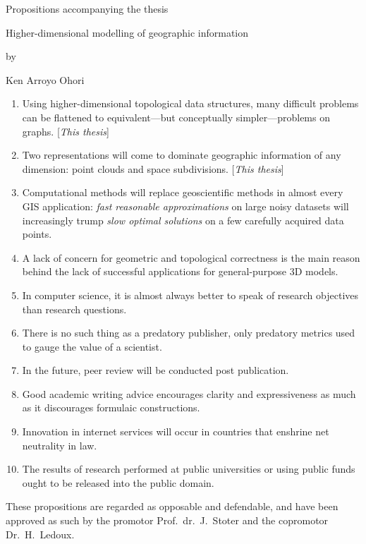\documentclass[parskip=half,
               fontsize=9pt]{scrartcl}
\begin{document}
\pagestyle{empty}

\begin{center}

Propositions accompanying the thesis

{\Large\fanciestfont{}Higher-dimensional modelling of geographic information}

by

{\Large Ken Arroyo Ohori}

\end{center}

\bigskip

\begin{enumerate}


\item
Using higher-dimensional topological data structures, many difficult problems can be flattened to equivalent---but conceptually simpler---problems on graphs. [\emph{This thesis}]

\item
Two representations will come to dominate geographic information of any dimension: point clouds and space subdivisions. [\emph{This thesis}]


\item
Computational methods will replace geoscientific methods in almost every GIS application:
\emph{fast reasonable approximations} on large noisy datasets will increasingly trump \emph{slow optimal solutions} on a few carefully acquired data points.

\item
A lack of concern for geometric and topological correctness is the main reason behind the lack of successful applications for general-purpose 3D models.

\item
In computer science, it is almost always better to speak of research objectives than research questions.


\item
There is no such thing as a predatory publisher, only predatory metrics used to gauge the value of a scientist.

\item
In the future, peer review will be conducted post publication.

\item
Good academic writing advice encourages clarity and expressiveness as much as it discourages formulaic constructions.


\item
Innovation in internet services will occur in countries that enshrine net neutrality in law.

\item
The results of research performed at public universities or using public funds ought to be released into the public domain.

\end{enumerate}

\vfill
These propositions are regarded as opposable and defendable, and have been approved as such by the promotor Prof.\ dr.\ J.\ Stoter and the copromotor Dr.\ H.\ Ledoux.
\end{document}
